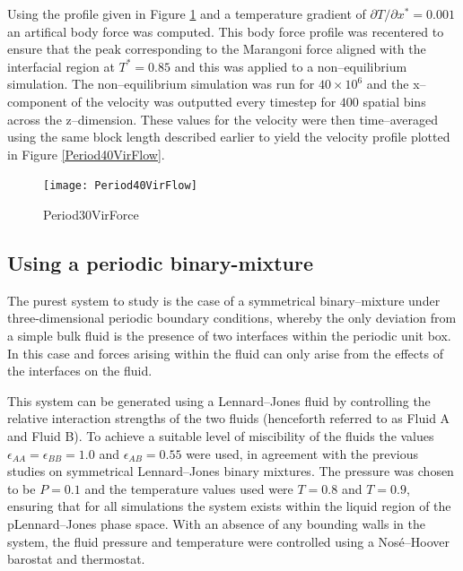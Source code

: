 Using the profile given in Figure \ref{Period30VirForce} and a temperature gradient of $\partial T / \partial x^{*} = 0.001$ an artifical body force was computed.
This body force profile was recentered to ensure that the peak corresponding to the Marangoni force aligned with the interfacial region at $T^{*} = 0.85$ and this was applied to a non--equilibrium simulation.
The non--equilibrium simulation was run for $40 \times 10^{6}$ and the x--component of the velocity was outputted every timestep for $400$ spatial bins across the z--dimension. 
These values for the velocity were then time--averaged using the same block length described earlier to yield the velocity profile plotted in Figure \ref{Period40VirFlow}.

\begin{figure}[h]
\centering
\texttt{[image: Period40VirFlow]}
\caption{Period30VirForce}
\label{Period30VirForce}
\end{figure}


\subsection{Using a periodic binary-mixture}
The purest system to study is the case of a symmetrical binary--mixture under three-dimensional periodic boundary conditions, whereby the only deviation from a simple bulk fluid is the presence of two interfaces within the periodic unit box. 
In this case and forces arising within the fluid can only arise from the effects of the interfaces on the fluid.

This system can be generated using a Lennard--Jones fluid by controlling the relative interaction strengths of the two fluids (henceforth referred to as Fluid A and Fluid B).
To achieve a suitable level of miscibility of the fluids the values $\epsilon_{AA} = \epsilon_{BB} = 1.0$ and $\epsilon_{AB}=0.55$ were used, in agreement with the previous studies on symmetrical Lennard--Jones binary mixtures.\cite{MorenzoRazo,Blas}
The pressure was chosen to be $P=0.1$ and the temperature values used were $T=0.8$ and $T=0.9$, ensuring that for all simulations the system exists within the liquid region of the pLennard--Jones phase space.\cite{Smit}
With an absence of any bounding walls in the system, the fluid pressure and temperature were controlled using a Nos\'{e}--Hoover barostat and thermostat.

